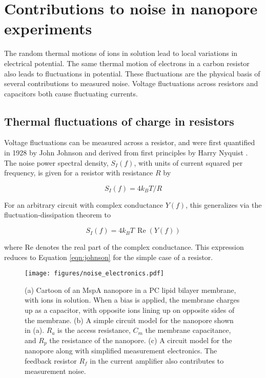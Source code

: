 \section{Contributions to noise in nanopore experiments}

The random thermal motions of ions in solution lead to local variations in electrical potential.  The same thermal motion of electrons in a carbon resistor also leads to fluctuations in potential.  These fluctuations are the physical basis of several contributions to measured noise.  Voltage fluctuations across resistors and capacitors both cause fluctuating currents.

\subsection{Thermal fluctuations of charge in resistors}

Voltage fluctuations can be measured across a resistor, and were first quantified in 1928 by John Johnson \citep{Johnson1928} and derived from first principles by Harry Nyquist \citep{Nyquist1928}.  The noise power spectral density, $S_I (f)$, with units of current squared per frequency, is given for a resistor with resistance $R$ by

\begin{equation}
S_I(f) = 4 k_B T / R
\label{eqn:johnson}
\end{equation}

For an arbitrary circuit with complex conductance $Y(f)$, this generalizes via the fluctuation-dissipation theorem to \citep{Kogan1996, Hoogerheide2010, Sakmann1995}

\begin{equation}
S_I(f) = 4 k_B T \, \operatorname{Re}(Y(f))
\label{eqn:general}
\end{equation}

\noindent
where Re denotes the real part of the complex conductance.  This expression reduces to Equation \ref{eqn:johnson} for the simple case of a resistor.

\begin{figure}[h]
\begin{centering}
\texttt{[image: figures/noise\_electronics.pdf]}
\caption[Simple electrical model of the nanopore setup]{(a) Cartoon of an MspA nanopore in a PC lipid bilayer membrane, with ions in solution.  When a bias is applied, the membrane charges up as a capacitor, with opposite ions lining up on opposite sides of the membrane.  (b) A simple circuit model for the nanopore shown in (a).  $R_a$ is the access resistance, $C_m$ the membrane capacitance, and $R_p$ the resistance of the nanopore.  (c) A circuit model for the nanopore along with simplified measurement electronics.  The feedback resistor $R_f$ in the current amplifier also contributes to measurement noise.}
\label{fig:circuit_equiv}
\end{centering}
\end{figure}

